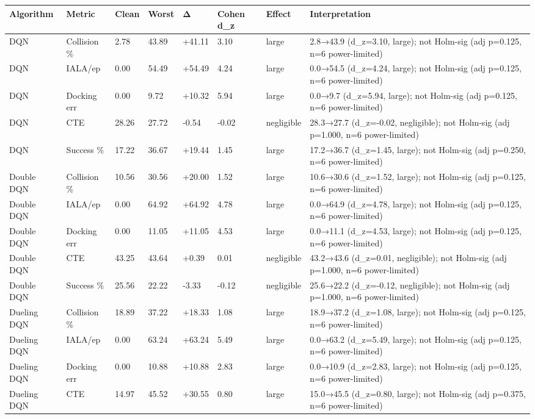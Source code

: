 \begin{tabular}{llllllll}
\toprule
Algorithm & Metric & Clean & Worst & Δ & Cohen d\_z & Effect & Interpretation \\
\midrule
DQN & Collision \% & 2.78 & 43.89 & +41.11 & 3.10 & large & 2.8→43.9 (d\_z=3.10, large); not Holm-sig (adj p=0.125, n=6 power-limited) \\
DQN & IALA/ep & 0.00 & 54.49 & +54.49 & 4.24 & large & 0.0→54.5 (d\_z=4.24, large); not Holm-sig (adj p=0.125, n=6 power-limited) \\
DQN & Docking err & 0.00 & 9.72 & +10.32 & 5.94 & large & 0.0→9.7 (d\_z=5.94, large); not Holm-sig (adj p=0.125, n=6 power-limited) \\
DQN & CTE & 28.26 & 27.72 & -0.54 & -0.02 & negligible & 28.3→27.7 (d\_z=-0.02, negligible); not Holm-sig (adj p=1.000, n=6 power-limited) \\
DQN & Success \% & 17.22 & 36.67 & +19.44 & 1.45 & large & 17.2→36.7 (d\_z=1.45, large); not Holm-sig (adj p=0.250, n=6 power-limited) \\
Double DQN & Collision \% & 10.56 & 30.56 & +20.00 & 1.52 & large & 10.6→30.6 (d\_z=1.52, large); not Holm-sig (adj p=0.125, n=6 power-limited) \\
Double DQN & IALA/ep & 0.00 & 64.92 & +64.92 & 4.78 & large & 0.0→64.9 (d\_z=4.78, large); not Holm-sig (adj p=0.125, n=6 power-limited) \\
Double DQN & Docking err & 0.00 & 11.05 & +11.05 & 4.53 & large & 0.0→11.1 (d\_z=4.53, large); not Holm-sig (adj p=0.125, n=6 power-limited) \\
Double DQN & CTE & 43.25 & 43.64 & +0.39 & 0.01 & negligible & 43.2→43.6 (d\_z=0.01, negligible); not Holm-sig (adj p=1.000, n=6 power-limited) \\
Double DQN & Success \% & 25.56 & 22.22 & -3.33 & -0.12 & negligible & 25.6→22.2 (d\_z=-0.12, negligible); not Holm-sig (adj p=1.000, n=6 power-limited) \\
Dueling DQN & Collision \% & 18.89 & 37.22 & +18.33 & 1.08 & large & 18.9→37.2 (d\_z=1.08, large); not Holm-sig (adj p=0.125, n=6 power-limited) \\
Dueling DQN & IALA/ep & 0.00 & 63.24 & +63.24 & 5.49 & large & 0.0→63.2 (d\_z=5.49, large); not Holm-sig (adj p=0.125, n=6 power-limited) \\
Dueling DQN & Docking err & 0.00 & 10.88 & +10.88 & 2.83 & large & 0.0→10.9 (d\_z=2.83, large); not Holm-sig (adj p=0.125, n=6 power-limited) \\
Dueling DQN & CTE & 14.97 & 45.52 & +30.55 & 0.80 & large & 15.0→45.5 (d\_z=0.80, large); not Holm-sig (adj p=0.375, n=6 power-limited) \\

\end{tabular}
